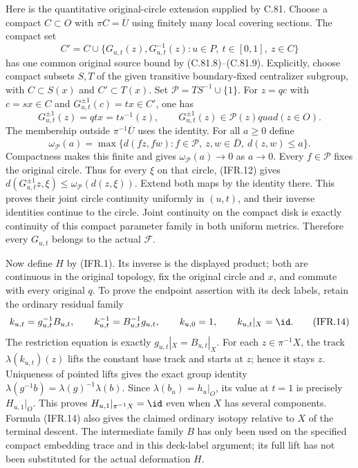 Here is the quantitative original-circle extension supplied by C.81.
Choose a compact $C\subset O$ with $\pi C=\overline U$ using finitely
many local covering sections. The compact set
\[
 C'=C\cup\{G_{u,t}(z),G_{u,t}^{-1}(z):u\in P,\ t\in[0,1],\ z\in C\}
                                                               \tag{IFR.11}
\]
has one common original source bound by (C.81.8)--(C.81.9).
Explicitly, choose compact subsets $S,T$ of the given transitive
boundary-fixed centralizer subgroup, with $C\subset S(x)$ and
$C'\subset T(x)$. Set $\mathcal P=TS^{-1}\cup\{1\}$.
For $z=qc$ with $c=sx\in C$ and $G_{u,t}^{\pm1}(c)=tx\in C'$, one has
\[
 G_{u,t}^{\pm1}(z)=qtx=ts^{-1}(z),\qquad
 G_{u,t}^{\pm1}(z)\in\mathcal P(z)quad(z\in O).                \tag{IFR.12}
\]
The membership outside $\pi^{-1}\overline U$ uses the identity.
For all $a\geq0$ define
\[
 \omega_{\mathcal P}(a)=
 \max\{d(fz,fw):f\in\mathcal P,\ z,w\in\overline D,
                                                   \ d(z,w)\leq a\}.
                                                               \tag{IFR.13}
\]
Compactness makes this finite and gives $\omega_{\mathcal P}(a)\to0$
as $a\to0$. Every $f\in\mathcal P$ fixes the original circle.
Thus for every $\xi$ on that circle, (IFR.12) gives
$d(G_{u,t}^{\pm1}z,\xi)\leq\omega_{\mathcal P}(d(z,\xi))$.
Extend both maps by the identity there. This proves their joint
circle continuity uniformly in $(u,t)$, and their inverse identities
continue to the circle. Joint continuity on the compact disk is
exactly continuity of this compact parameter family in both uniform
metrics. Therefore every $G_{u,t}$ belongs to the actual $\mathscr F$.

Now define $H$ by (IFR.1). Its inverse is the displayed product;
both are continuous in the original topology, fix the original
circle and $x$, and commute with every original $q$.
To prove the endpoint assertion with its deck labels, retain the
ordinary residual family
\[
 k_{u,t}=g_{u,t}^{-1}B_{u,t},\qquad
 k_{u,t}^{-1}=B_{u,t}^{-1}g_{u,t},\qquad
 k_{u,0}=1,\qquad k_{u,t}|_X=\id.                              \tag{IFR.14}
\]
The restriction equation is exactly $g_{u,t}|_X=B_{u,t}|_X$.
For each $z\in\pi^{-1}X$, the track $\lambda(k_{u,t})(z)$
lifts the constant base track and starts at $z$; hence it stays $z$.
Uniqueness of pointed lifts gives the exact group identity
$\lambda(g^{-1}b)=\lambda(g)^{-1}\lambda(b)$.
Since $\lambda(b_u)=h_u|_O$, its value at $t=1$ is precisely
$H_{u,1}|_O$. This proves $H_{u,1}|_{\pi^{-1}X}=\id$ even when
$X$ has several components. Formula (IFR.14) also gives the claimed
ordinary isotopy relative to $X$ of the terminal descent.
The intermediate family $B$ has only been used on the specified
compact embedding trace and in this deck-label argument; its full
lift has not been substituted for the actual deformation $H$.

